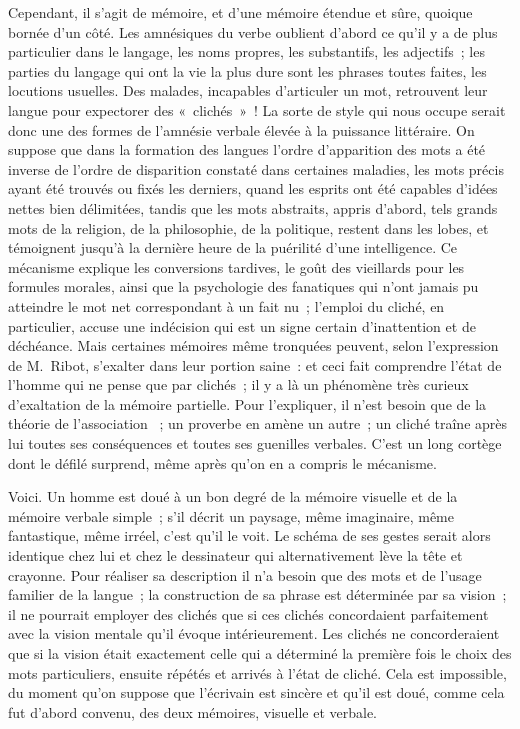 \documentclass[french,twoside]{book} %
\begin{document}
Cependant, il s’agit de mémoire, et d’une mémoire étendue et sûre, quoique bornée d’un côté. Les amnésiques du verbe oublient d’abord ce qu’il y a de plus particulier dans le langage, les noms propres, les substantifs, les adjectifs ; les parties du langage qui ont la vie la plus dure sont les phrases toutes faites, les locutions usuelles. Des malades, incapables d’articuler un mot, retrouvent leur langue pour expectorer des « clichés » ! La sorte de style qui nous occupe serait donc une des formes de l’amnésie verbale élevée à la puissance littéraire. On suppose que dans la formation des langues l’ordre d’apparition des mots a été inverse de l’ordre de disparition constaté dans certaines maladies, les mots précis ayant été trouvés ou fixés les derniers, quand les esprits ont été capables d’idées nettes bien délimitées, tandis que les mots abstraits, appris d’abord, tels grands mots de la religion, de la philosophie, de la politique, restent dans les lobes, et témoignent jusqu’à la dernière heure de la puérilité d’une intelligence. Ce mécanisme explique les conversions tardives, le goût des vieillards pour les formules morales, ainsi que la psychologie des fanatiques qui n’ont jamais pu atteindre le mot net correspondant à un fait nu ; l’emploi du cliché, en particulier, accuse une indécision qui est un signe certain d’inattention et de déchéance. Mais certaines mémoires même tronquées peuvent, selon l’expression de M. Ribot, s’exalter dans leur portion saine : et ceci fait comprendre l’état de l’homme qui ne pense que par clichés ; il y a là un phénomène très curieux d’exaltation de la mémoire partielle. Pour l’expliquer, il n’est besoin que de la théorie de l’association  ; un proverbe en amène un autre ; un cliché traîne après lui toutes ses conséquences et toutes ses guenilles verbales. C’est un long cortège dont le défilé surprend, même après qu’on en a compris le mécanisme.\par
Voici. Un homme est doué à un bon degré de la mémoire visuelle et de la mémoire verbale simple ; s’il décrit un paysage, même imaginaire, même fantastique, même irréel, c’est qu’il le voit. Le schéma de ses gestes serait alors identique chez lui et chez le dessinateur qui alternativement lève la tête et crayonne. Pour réaliser sa description il n’a besoin que des mots et de l’usage familier de la langue ; la construction de sa phrase est déterminée par sa vision ; il ne pourrait employer des clichés que si ces clichés concordaient parfaitement avec la vision mentale qu’il évoque intérieurement. Les clichés ne concorderaient que si la vision était exactement celle qui a déterminé la première fois le choix des mots particuliers, ensuite répétés et arrivés à l’état de cliché. Cela est impossible, du moment qu’on suppose que l’écrivain est sincère et qu’il est doué, comme cela fut d’abord convenu, des deux mémoires, visuelle et verbale.\par
\end{document}
